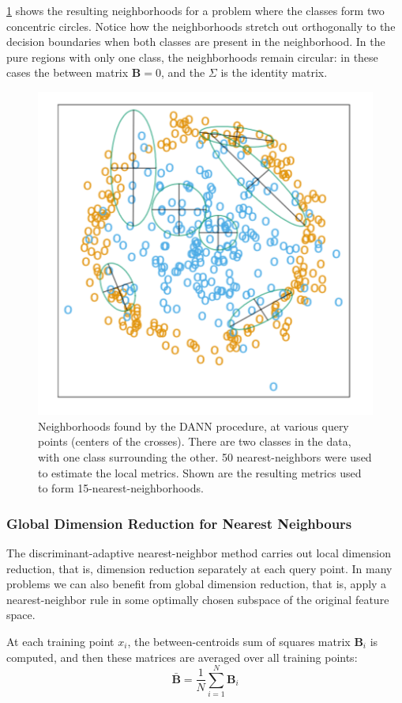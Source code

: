 \documentclass[12pt, letterpaper]{article}
\theoremstyle{definition}
\begin{document}
\ref{DANNConcentr} shows the resulting neighborhoods for a problem where the classes form two concentric circles. Notice how the neighborhoods stretch out orthogonally to the decision boundaries when both classes are present in the neighborhood. In the pure regions with only one class, the neighborhoods remain circular: in these cases the between matrix $\mathbf{B} = 0$, and the $\Sigma$ is the identity matrix.
\begin{figure}
\centering
\includegraphics[scale=0.7]{img/DANNConcentr}
\caption{ Neighborhoods found by the DANN procedure, at various query points (centers of the crosses). There are two classes in the data, with one class surrounding the other. 50 nearest-neighbors were used to estimate the local metrics. Shown are the resulting metrics used to form 15-nearest-neighborhoods.}
\label{DANNConcentr}
\end{figure}

\subsubsection{Global Dimension Reduction for Nearest Neighbours}
The discriminant-adaptive nearest-neighbor method carries out local dimension reduction, that is, dimension reduction separately at each query point. In many problems we can also benefit from global dimension reduction, that is, apply a nearest-neighbor rule in some optimally chosen subspace of the original feature space.

At each training point $x_i$, the between-centroids sum of squares matrix $\mathbf{B}_i$ is computed, and then these matrices are averaged over all training points:
\begin{equation}
\bar{\mathbf{B}} = \frac{1}{N} \sum_{i=1}^N \mathbf{B}_i
\end{equation}
\end{document}
